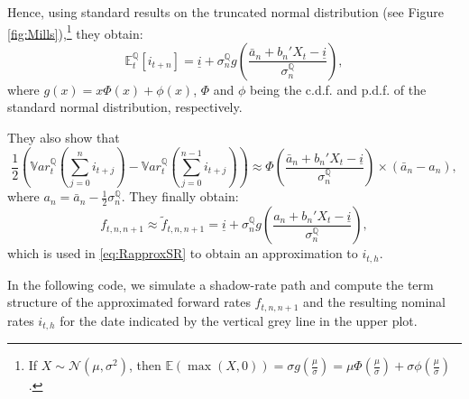 \documentclass[
  12pt,
]{book}
\theoremstyle{definition}
\theoremstyle{definition}
\theoremstyle{definition}
\theoremstyle{definition}
\theoremstyle{remark}
\begin{document}
Hence, using standard results on the truncated normal distribution (see Figure \ref{fig:Mills}),\footnote{If \(X\sim \mathcal{N}(\mu,\sigma^2)\), then \(\mathbb{E}(\max(X,0))=\sigma g\left(\frac{\mu}{\sigma}\right)= \mu\Phi\left(\frac{\mu}{\sigma}\right)+\sigma\phi\left(\frac{\mu}{\sigma}\right)\).} they obtain:
\[
\mathbb{E}_t^{\mathbb{Q}}[i_{t+n}] = \underline{i} + \sigma_n^{\mathbb{Q}}g\left(\frac{\bar{a}_n + b_n'X_t - \underline{i}}{\sigma_n^{\mathbb{Q}}}\right),
\]
where \(g(x)= x\Phi(x)+\phi(x)\), \(\Phi\) and \(\phi\) being the c.d.f. and p.d.f. of the standard normal distribution, respectively.

They also show that
\[
\frac{1}{2}\left(\mathbb{V}ar_t^{\mathbb{Q}}\left(\sum_{j=0}^n i_{t+j}\right)-\mathbb{V}ar_t^{\mathbb{Q}}\left(\sum_{j=0}^{n-1} i_{t+j}\right)\right) \approx \Phi\left(\frac{\bar{a}_n + b_n'X_t - \underline{i}}{\sigma_n^{\mathbb{Q}}}\right)\times(\bar{a}_n - a_n),
\]
where \(a_n = \bar{a}_n - \frac{1}{2}\sigma_n^{\mathbb{Q}}\). They finally obtain:
\[
\boxed{f_{t,n,n+1} \approx \tilde{f}_{t,n,n+1} = \underline{i} + \sigma_n^{\mathbb{Q}}g\left(\frac{a_n + b_n'X_t - \underline{i}}{\sigma_n^{\mathbb{Q}}}\right),}
\]
which is used in \eqref{eq:RapproxSR} to obtain an approximation to \(i_{t,h}\).

In the following code, we simulate a shadow-rate path and compute the term structure of the approximated forward rates \(f_{t,n,n+1}\) and the resulting nominal rates \(i_{t,h}\) for the date indicated by the vertical grey line in the upper plot.
\end{document}
